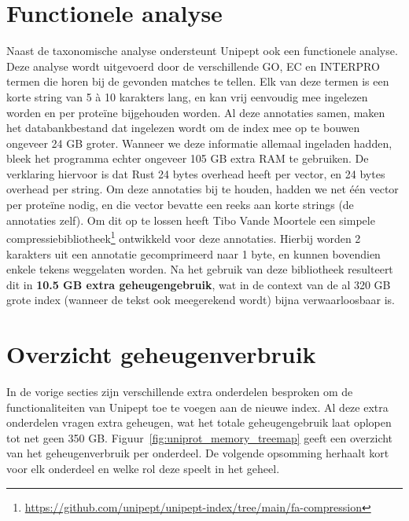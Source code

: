 \section{Functionele analyse}\label{sec:functionele-analyse}
Naast de taxonomische analyse ondersteunt Unipept ook een functionele analyse.
Deze analyse wordt uitgevoerd door de verschillende GO, EC en INTERPRO termen die horen bij de gevonden matches te tellen.
Elk van deze termen is een korte string van 5 à 10 karakters lang, en kan vrij eenvoudig mee ingelezen worden en per proteïne bijgehouden worden.
Al deze annotaties samen, maken het databankbestand dat ingelezen wordt om de index mee op te bouwen ongeveer 24 GB groter.
Wanneer we deze informatie allemaal ingeladen hadden, bleek het programma echter ongeveer 105 GB extra RAM te gebruiken.
De verklaring hiervoor is dat Rust 24 bytes overhead heeft per vector, en 24 bytes overhead per string.
Om deze annotaties bij te houden, hadden we net één vector per proteïne nodig, en die vector bevatte een reeks aan korte strings (de annotaties zelf).
Om dit op te lossen heeft Tibo Vande Moortele een simpele compressiebibliotheek\footnote{\url{https://github.com/unipept/unipept-index/tree/main/fa-compression}} ontwikkeld voor deze annotaties.
Hierbij worden 2 karakters uit een annotatie gecomprimeerd naar 1 byte, en kunnen bovendien enkele tekens weggelaten worden.
Na het gebruik van deze bibliotheek resulteert dit in \textbf{10.5 GB extra geheugengebruik}, wat in de context van de al 320 GB grote index (wanneer de tekst ook meegerekend wordt) bijna verwaarloosbaar is.


\section{Overzicht geheugenverbruik}
In de vorige secties zijn verschillende extra onderdelen besproken om de functionaliteiten van Unipept toe te voegen aan de nieuwe index.
Al deze extra onderdelen vragen extra geheugen, wat het totale geheugengebruik laat oplopen tot net geen 350 GB\@.
Figuur~\ref{fig:uniprot_memory_treemap} geeft een overzicht van het geheugenverbruik per onderdeel.
De volgende opsomming herhaalt kort voor elk onderdeel en welke rol deze speelt in het geheel.

